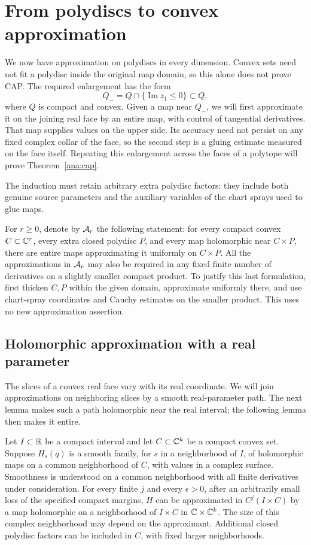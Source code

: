 \section{From polydiscs to convex approximation}\label{sec:globalization}

We now have approximation on polydiscs in every dimension. Convex
sets need not fit a polydisc inside the original map domain, so this
alone does not prove CAP. The required enlargement has the form
\[
 Q_-=Q\cap\{\operatorname{Im}z_1\leq0\}\subset Q,
\]
where $Q$ is compact and convex. Given a map near $Q_-$, we will
first approximate it on the joining real face by an entire map,
with control of tangential derivatives. That map supplies values on
the upper side. Its accuracy need not persist on any fixed complex
collar of the face, so the second step is a gluing estimate measured
on the face itself. Repeating this enlargement across the faces of
a polytope will prove Theorem~\ref{ana:cap}.

The induction must retain arbitrary extra polydisc factors: they
include both genuine source parameters and the auxiliary variables
of the chart sprays used to glue maps.

For \(r\geq0\), denote by \({\cal A}_r\) the following statement:
for every compact convex \(C\subset\mathbb C^r\), every extra closed
polydisc \(P\), and every map holomorphic near \(C\times P\),
there are entire maps approximating it uniformly on \(C\times P\).
All the approximations in \({\cal A}_r\) may also be required in
any fixed finite number of derivatives on a slightly smaller
compact product.  To justify this last formulation, first
thicken \(C,P\) within the given domain, approximate uniformly
there, and use chart-spray coordinates and Cauchy estimates on
the smaller product.  This uses no new approximation assertion.

\subsection{Holomorphic approximation with a real parameter}

The slices of a convex real face vary with its real coordinate.
We will join approximations on neighboring slices by a smooth
real-parameter path. The next lemma makes such a path holomorphic
near the real interval; the following lemma then makes it entire.

\begin{lemma}\label{glue:interval}
Let $I\subset\mathbb R$ be a compact interval and let $C\subset\mathbb C^k$ be a
compact convex set. Suppose $H_s(q)$ is a smooth family, for $s$ in a
neighborhood of $I$, of holomorphic maps on a common neighborhood of
$C$, with values in a complex surface. Smoothness is understood on a
common neighborhood with all finite derivatives under consideration.
For every finite $j$ and every $\epsilon>0$, after an arbitrarily small
loss of the specified compact margins, $H$ can be approximated in
$C^j(I\times C)$ by a map holomorphic on a neighborhood of $I\times C$
in $\mathbb C\times\mathbb C^k$. The size of this complex neighborhood may depend on
the approximant. Additional closed polydisc factors can be included in
$C$, with fixed larger neighborhoods.
\end{lemma}

